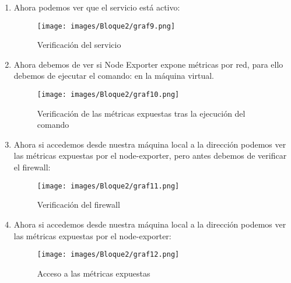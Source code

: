 \begin{enumerate}
\begin{enumerate}
        \item Ahora podemos ver que el servicio está activo:
        \begin{figure}[H]
            \centering
            \texttt{[image: images/Bloque2/graf9.png]}
            \caption{Verificación del servicio}
            \label{fig:verificacion_servicio}
        \end{figure}
        \item Ahora debemos de ver si Node Exporter expone métricas por red, para ello debemos de ejecutar el comando:  en la máquina virtual.
        \begin{figure}[H]
            \centering
            \texttt{[image: images/Bloque2/graf10.png]}
            \caption{Verificación de las métricas expuestas tras la ejecución del comando}
            \label{fig:metricas}
        \end{figure}
        \item Ahora si accedemos desde nuestra máquina local a la dirección  podemos ver las métricas expuestas por el node-exporter, pero antes debemos de verificar el firewall:
        \begin{figure}[H]
            \centering
            \texttt{[image: images/Bloque2/graf11.png]}
            \caption{Verificación del firewall}
            \label{fig:firewall}
        \end{figure}
        \item Ahora si accedemos desde nuestra máquina local a la dirección  podemos ver las métricas expuestas por el node-exporter:
        \begin{figure}[H]
            \centering
            \texttt{[image: images/Bloque2/graf12.png]}
            \caption{Acceso a las métricas expuestas}
            \label{fig:acceso_metricas}
        \end{figure}


\end{enumerate}
\end{enumerate}
